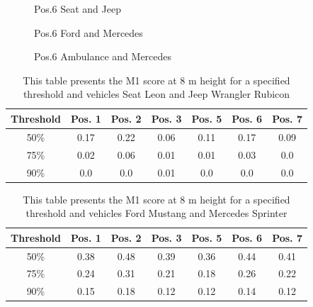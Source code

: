 \begin{figure}[!htb]
  
  \caption{Pos.6 Seat and Jeep}\label{fig:pos6_8m}
\endminipage\hfill
{}
  
  \caption{Pos.6 Ford and Mercedes}\label{fig:pos6_ford_merc}
\endminipage\hfill
\end{figure}

\newpage
\begin{figure}[!htb]
    
  \caption{Pos.6 Ambulance and Mercedes}\label{fig:pos6_amb_merc}
\endminipage\hfill
\end{figure}

\begin{table}[!htb]
\caption{This table presents the M1 score at 8 m height for a specified threshold and vehicles Seat Leon and Jeep Wrangler Rubicon\label{tab:jeep_seat_threshold}}
\centering
    \begin{tabular}{ | c | c | c | c | c | c | c |}
    \hline
    Threshold & Pos. 1 & Pos. 2 & Pos. 3 & Pos. 5 & Pos. 6 & Pos. 7 \\ \hline
    50\% & 0.17 & 0.22 & 0.06 & 0.11 & 0.17 & 0.09\\ \hline
    75\% & 0.02 & 0.06 & 0.01 & 0.01 & 0.03 & 0.0\\ \hline
    90\% & 0.0 & 0.0 & 0.01 & 0.0 & 0.0 & 0.0\\ \hline
    \end{tabular}
\end{table}

\newpage
\begin{table}[!htb]
\caption{This table presents the M1 score at 8 m height for a specified threshold and vehicles Ford Mustang and Mercedes Sprinter\label{tab:ford_merc_threshold}}
\centering
    \begin{tabular}{ | c | c | c | c | c | c | c |}
    \hline
    Threshold & Pos. 1 & Pos. 2 & Pos. 3 & Pos. 5 & Pos. 6 & Pos. 7 \\ \hline
    50\% & 0.38 & 0.48 & 0.39 & 0.36 & 0.44 & 0.41\\ \hline
    75\% & 0.24 & 0.31 & 0.21 & 0.18 & 0.26 & 0.22\\ \hline
    90\% & 0.15 & 0.18 & 0.12 & 0.12 & 0.14 & 0.12\\ \hline
    \end{tabular}
\end{table}

